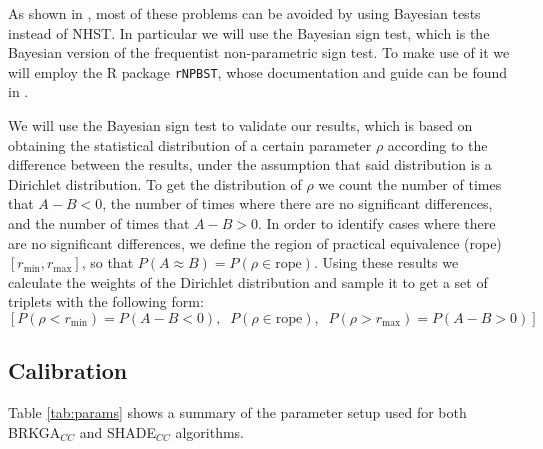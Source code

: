 \documentclass[review]{elsarticle}
\begin{document}
As shown in \cite{benavoli2017time}, most of these problems can be avoided by using Bayesian tests instead of NHST. In particular we will use the Bayesian sign test, which is the Bayesian version of the frequentist non-parametric sign test. To make use of it we will employ the R package \texttt{rNPBST}, whose documentation and guide can be found in \cite{carrasco2017rnpbst}.

We will use the Bayesian sign test to validate our results, which is based on obtaining the statistical distribution of a certain parameter $\rho$ according to the difference between the results, under the assumption that said distribution is a Dirichlet distribution. To get the distribution of $\rho$ we count the number of times that $A - B < 0$, the number of times where there are no significant differences, and the number of times that $A - B > 0$. In order to identify cases where there are no significant differences, we define the region of practical equivalence (rope) $[r_\text{min}, r_\text{max}]$, so that $P(A \approx B) = P(\rho \in \text{rope})$. Using these results we calculate the weights of the Dirichlet distribution and sample it to get a set of triplets with the following form: 
$$[P(\rho < r_\text{min}) = P(A - B < 0),\;\; P(\rho \in \text{rope}),\;\; P(\rho > r_\text{max}) = P(A - B > 0)]$$

\subsection{Calibration}

Table \ref{tab:params} shows a summary of the parameter setup used for both BRKGA$_{CC}$ and SHADE$_{CC}$ algorithms.

\begin{table}[!h]
	\centering
	\setlength{\tabcolsep}{7pt}
	\renewcommand{\arraystretch}{1.4}

	\caption{Parameters setup used for BRKGA$_{CC}$ and SHADE$_{CC}$.}
	\label{tab:params}
\end{table}
\end{document}
